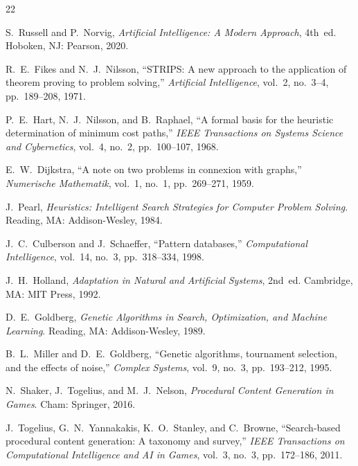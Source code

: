 \documentclass[12pt, a4paper]{report}
\begin{document}
\begin{thebibliography}{22}

S.~Russell and P.~Norvig,
\textit{Artificial Intelligence: A Modern Approach}, 4th~ed.
Hoboken, NJ: Pearson, 2020.

R.~E.~Fikes and N.~J.~Nilsson,
``STRIPS: A new approach to the application of theorem proving to problem
solving,''
\textit{Artificial Intelligence}, vol.~2, no.~3--4, pp.~189--208, 1971.

P.~E.~Hart, N.~J.~Nilsson, and B.~Raphael,
``A formal basis for the heuristic determination of minimum cost paths,''
\textit{IEEE Transactions on Systems Science and Cybernetics}, vol.~4, no.~2,
pp.~100--107, 1968.

E.~W.~Dijkstra,
``A note on two problems in connexion with graphs,''
\textit{Numerische Mathematik}, vol.~1, no.~1, pp.~269--271, 1959.

J.~Pearl,
\textit{Heuristics: Intelligent Search Strategies for Computer Problem Solving}.
Reading, MA: Addison-Wesley, 1984.

J.~C.~Culberson and J.~Schaeffer,
``Pattern databases,''
\textit{Computational Intelligence}, vol.~14, no.~3, pp.~318--334, 1998.

J.~H.~Holland,
\textit{Adaptation in Natural and Artificial Systems}, 2nd~ed.
Cambridge, MA: MIT Press, 1992.

D.~E.~Goldberg,
\textit{Genetic Algorithms in Search, Optimization, and Machine Learning}.
Reading, MA: Addison-Wesley, 1989.

B.~L.~Miller and D.~E.~Goldberg,
``Genetic algorithms, tournament selection, and the effects of noise,''
\textit{Complex Systems}, vol.~9, no.~3, pp.~193--212, 1995.

N.~Shaker, J.~Togelius, and M.~J.~Nelson,
\textit{Procedural Content Generation in Games}.
Cham: Springer, 2016.

J.~Togelius, G.~N.~Yannakakis, K.~O.~Stanley, and C.~Browne,
``Search-based procedural content generation: A taxonomy and survey,''
\textit{IEEE Transactions on Computational Intelligence and AI in Games},
vol.~3, no.~3, pp.~172--186, 2011.


\end{thebibliography}
\end{document}
